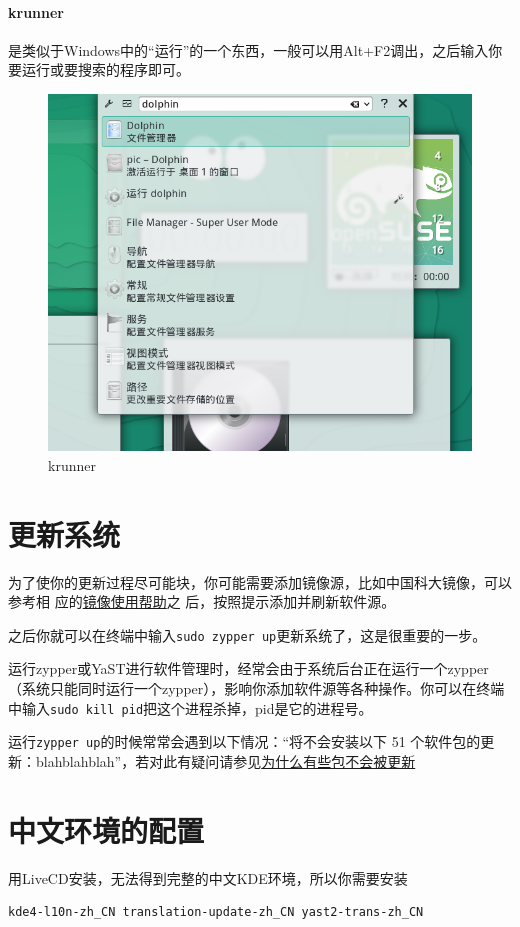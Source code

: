 \documentclass[11pt,openany]{book}
\newcommand{\command}[1]{\texttt{\textcolor{codec}{#1}}}
\newcommand{\zy}{zypper或YaST}
\begin{document}
\paragraph{krunner} 是类似于Windows中的“运行”的一个东西，一般可以用Alt+F2调出，之后输入你要运行或要搜索的程序即可。
\begin{figure}[htbp]
\centering
\includegraphics[width=\textwidth]{./pic/krunner.png} 
\caption{krunner}
\end{figure}
\section{更新系统}
为了使你的更新过程尽可能块，你可能需要添加镜像源，比如中国科大镜像，可以参考相
应的\href{https://lug.ustc.edu.cn/wiki/mirrors/help/opensuse}{镜像使用帮助}之
后，按照提示添加并刷新软件源。

之后你就可以在终端中输入\command{sudo zypper up}更新系统了，这是很重要的一步。

运行\zy 进行软件管理时，经常会由于系统后台正在运行一个zypper（系统只能同时运行一个zypper），影响你添加软件源等各种操作。你可以在终端中输入\command{sudo kill pid}把这个进程杀掉，pid是它的进程号。

运行\command{zypper up}的时候常常会遇到以下情况：“将不会安装以下 51 个软件包的更新：blahblahblah”，若对此有疑问请参见\href{https://forum.suse.org.cn/viewtopic.php?t=2777&p=21896}{为什么有些包不会被更新}
\section{中文环境的配置}
用LiveCD安装，无法得到完整的中文KDE环境，所以你需要安装
\begin{Verbatim}[formatcom=\color{codec}]
    kde4-l10n-zh_CN translation-update-zh_CN yast2-trans-zh_CN
\end{Verbatim}
\end{document}
